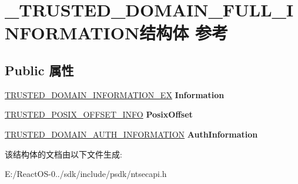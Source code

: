 \hypertarget{struct___t_r_u_s_t_e_d___d_o_m_a_i_n___f_u_l_l___i_n_f_o_r_m_a_t_i_o_n}{}\section{\+\_\+\+T\+R\+U\+S\+T\+E\+D\+\_\+\+D\+O\+M\+A\+I\+N\+\_\+\+F\+U\+L\+L\+\_\+\+I\+N\+F\+O\+R\+M\+A\+T\+I\+O\+N结构体 参考}
\label{struct___t_r_u_s_t_e_d___d_o_m_a_i_n___f_u_l_l___i_n_f_o_r_m_a_t_i_o_n}
\subsection*{Public 属性}
\begin{DoxyCompactItemize}
\item 
\mbox{\label{struct___t_r_u_s_t_e_d___d_o_m_a_i_n___f_u_l_l___i_n_f_o_r_m_a_t_i_o_n_a9f29e5d5a4b5943e74d413b0817809df}} 
\hyperlink{struct___t_r_u_s_t_e_d___d_o_m_a_i_n___i_n_f_o_r_m_a_t_i_o_n___e_x}{T\+R\+U\+S\+T\+E\+D\+\_\+\+D\+O\+M\+A\+I\+N\+\_\+\+I\+N\+F\+O\+R\+M\+A\+T\+I\+O\+N\+\_\+\+EX} {\bfseries Information}
\item 
\mbox{\label{struct___t_r_u_s_t_e_d___d_o_m_a_i_n___f_u_l_l___i_n_f_o_r_m_a_t_i_o_n_a7a81e36bcb0a04c5f6c0999dcad5b4c0}} 
\hyperlink{struct___t_r_u_s_t_e_d___p_o_s_i_x___o_f_f_s_e_t___i_n_f_o}{T\+R\+U\+S\+T\+E\+D\+\_\+\+P\+O\+S\+I\+X\+\_\+\+O\+F\+F\+S\+E\+T\+\_\+\+I\+N\+FO} {\bfseries Posix\+Offset}
\item 
\mbox{\label{struct___t_r_u_s_t_e_d___d_o_m_a_i_n___f_u_l_l___i_n_f_o_r_m_a_t_i_o_n_a48bcd6e943df5e31af94721487266442}} 
\hyperlink{struct___t_r_u_s_t_e_d___d_o_m_a_i_n___a_u_t_h___i_n_f_o_r_m_a_t_i_o_n}{T\+R\+U\+S\+T\+E\+D\+\_\+\+D\+O\+M\+A\+I\+N\+\_\+\+A\+U\+T\+H\+\_\+\+I\+N\+F\+O\+R\+M\+A\+T\+I\+ON} {\bfseries Auth\+Information}
\end{DoxyCompactItemize}


该结构体的文档由以下文件生成\+:\begin{DoxyCompactItemize}
\item 
E\+:/\+React\+O\+S-\/0../sdk/include/psdk/ntsecapi.\+h\end{DoxyCompactItemize}

